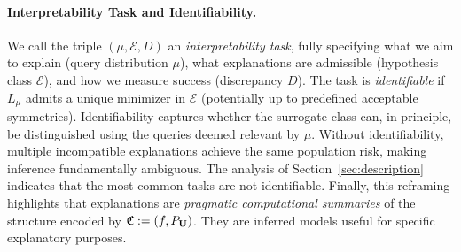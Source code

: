 \paragraph{Interpretability Task and Identifiability.}
We call the triple $(\mu, \mathcal{E}, D)$ an \emph{interpretability task}, fully specifying what we aim to explain (query distribution $\mu$), what explanations are admissible (hypothesis class $\mathcal{E}$), and how we measure success (discrepancy $D$).
% 
The task is \emph{identifiable} if $L_\mu$ admits a unique minimizer in $\mathcal{E}$ (potentially up to predefined acceptable symmetries). Identifiability captures whether the surrogate class can, in principle, be distinguished using the queries deemed relevant by $\mu$. Without identifiability, multiple incompatible explanations achieve the same population risk, making inference fundamentally ambiguous. The analysis of Section~\ref{sec:description} indicates that the most common tasks are not identifiable.
% 
Finally, this reframing highlights that explanations are \emph{pragmatic computational summaries} of the structure encoded by $\mathfrak{C} := (f, P_{\mathbf{U}})$. They are inferred models useful for specific explanatory purposes. 

% 

